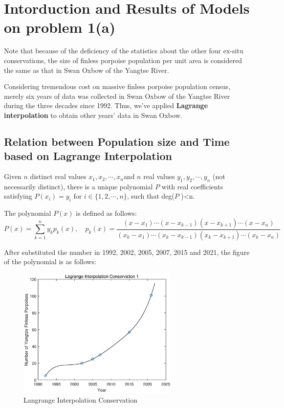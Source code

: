 \documentclass{mcmthesis}
\numberwithin{figure}{section}
\numberwithin{table}{section}
\numberwithin{equation}{section}
\begin{document}
\section{Intorduction and Results of Models on problem 1(a)}

Note that because of the deficiency of the statistics about the other four ex-situ conservations,
the size of finless porpoise population per unit area is considered 
the same as that in Swan Oxbow of the Yangtse River.
\par
Considering tremendous cost on massive finless porpoise population 
census, merely six years of data was collected in Swan Oxbow of the Yangtse River
during the three decades since 1992. \citep{Liuzhigang}
Thus, we've applied \textbf{Lagrange interpolation} to obtain other years' data
in Swan Oxbow.



\subsection{Relation between Population size and Time based on Lagrange Interpolation}
Given $ n $ distinct real values $ x_1, x_2, \cdots , x_n $and $ n $
real values $ y_1, y_2,\cdots, y_n $ (not necessarily distinct), there
is a unique polynomial $ P $ with real coefficients satisfying 
$ P(x_i)= y_i $ for $ i \in \{1,2,\cdots,n\} $, such that deg($ P $ )<n.
\par
The polynomial $ P(x) $ is defined as follows:   
$$
  P(x) = \sum \limits _{k = 1}^ny_kp_k(x),\quad
  p_k(x) = \frac{(x-x_1)\cdots (x-x_{k-1})(x-x_{k+1})\cdots (x-x_n)}{
    (x_k-x_1)\cdots (x_k-x_{k-1})(x_k-x_{k+1})\cdots (x_k-x_n)
  }
$$

After substituted the number in 1992, 2002, 2005, 2007, 2015 and 2021,
the figure of the polynomial is as follows:
\begin{figure}[htbp!]
  \centering
  \includegraphics[width = 8cm]{codes/Lagrange.eps}
  \caption{Langrange Interpolation Conservation}
\end{figure}
\end{document}
